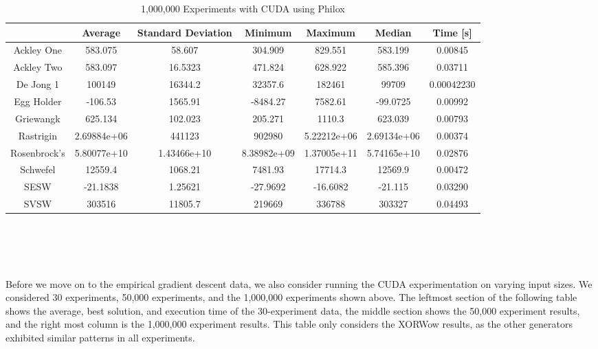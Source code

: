 \documentclass{article}
\begin{document}
        \begin{table}[h!]
            \begin{centering}
                \begin{tabular}{|c||c|c|c|c|c|c|}
                    \hline
                                & Average & Standard Deviation & Minimum & Maximum & Median & Time [s] \\
                    \hline
                    \hline
                    Ackley One & 583.075 & 58.607 & 304.909 & 829.551 & 583.199 & 0.00845 \\
                    \hline
                    Ackley Two & 583.097 & 16.5323 & 471.824 & 628.922 & 585.396 & 0.03711 \\
                    \hline
                    De Jong 1 & 100149 & 16344.2 & 32357.6 & 182461 & 99709 & 0.00042230\\
                    \hline
                    Egg Holder & -106.53 & 1565.91 & -8484.27 & 7582.61 & -99.0725 & 0.00992 \\
                    \hline
                    Griewangk & 625.134 & 102.023 & 205.271 & 1110.3 & 623.039 & 0.00793 \\
                    \hline
                    Rastrigin & 2.69884e+06 & 441123 & 902980 & 5.22212e+06 & 2.69134e+06 & 0.00374 \\
                    \hline
                    Rosenbrock's & 5.80077e+10 & 1.43466e+10 & 8.38982e+09 & 1.37005e+11 & 5.74165e+10 & 0.02876 \\
                    \hline
                    Schwefel & 12559.4 & 1068.21 & 7481.93 & 17714.3 & 12569.9 & 0.00472 \\
                    \hline
                    SESW & -21.1838 & 1.25621 & -27.9692 & -16.6082 & -21.115 & 0.03290\\
                    \hline
                    SVSW & 303516 & 11805.7 & 219669 & 336788 & 303327 & 0.04493\\
                    \hline
                \end{tabular}
                \caption{1,000,000 Experiments with CUDA using Philox}
            \end{centering}
            \end{table}
$ $ \\ $ $ \\ $ $ \\ $ $ \\ 
Before we move on to the empirical gradient descent data, we also consider running the CUDA experimentation on varying input sizes. We considered 30 experiments, 50,000 experiments, and the 1,000,000 experiments shown above. The leftmost section of the following table shows the average, best solution, and execution time of the 30-experiment data, the middle section shows the 50,000 experiment results, and the right most column is the 1,000,000 experiment results. This table only considers the XORWow results, as the other generators exhibited similar patterns in all experiments.
\end{document}
